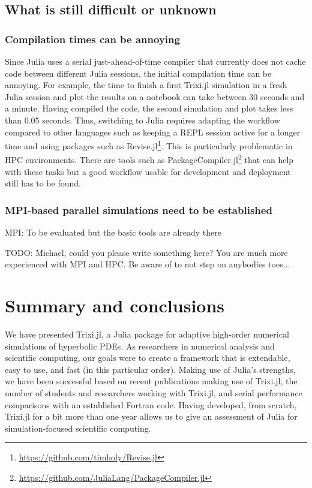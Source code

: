 \documentclass[hidelinks]{juliacon} %
\newcommand{\trixi}{Trixi.jl\xspace}
\newcommand{\todo}[1]{{\color{red}#1}}
\begin{document}
\subsection{What is still difficult or unknown}

\subsubsection{Compilation times can be annoying}

Since Julia uses a serial just-ahead-of-time compiler that currently does not cache
code between different Julia sessions, the initial compilation time can be
annoying. For example, the time to finish a first \trixi simulation in a fresh Julia
session and plot the results on a notebook can take between 30 seconds and a
minute. Having compiled the code, the second simulation and plot takes less than
0.05 seconds. Thus, switching to Julia requires adapting the workflow compared
to other languages such as keeping a REPL session active for a longer time and
using packages such as Revise.jl\footnote{\url{https://github.com/timholy/Revise.jl}}.
This is particularly problematic in HPC environments. There are tools such as
PackageCompiler.jl\footnote{\url{https://github.com/JuliaLang/PackageCompiler.jl}}
that can help with these tasks but a good workflow usable for development and
deployment still has to be found.

\subsubsection{MPI-based parallel simulations need to be established}

MPI: To be evaluated but the basic tools are already there \cite{byrne2021mpi}

\todo{TODO: Michael, could you please write something here? You are much more
experienced with MPI and HPC. Be aware of \cite{omlin2020solving, byrne2021mpi}
to not step on anybodies toes...} %


\section{Summary and conclusions}
\label{sec:summary}

We have presented \trixi, a Julia package for adaptive high-order numerical
simulations of hyperbolic PDEs. As researchers in numerical analysis and
scientific computing, our goals were to create a framework that is extendable,
easy to use, and fast (in this particular order). Making use of Julia's strengths,
we have been successful based on recent publications making use of \trixi,
the number of students and researchers working with \trixi, and serial performance
comparisons with an established Fortran code. Having developed, from scratch, \trixi for a bit
more than one year allows us to give an assessment of Julia for simulation-focused
scientific computing.
\end{document}
